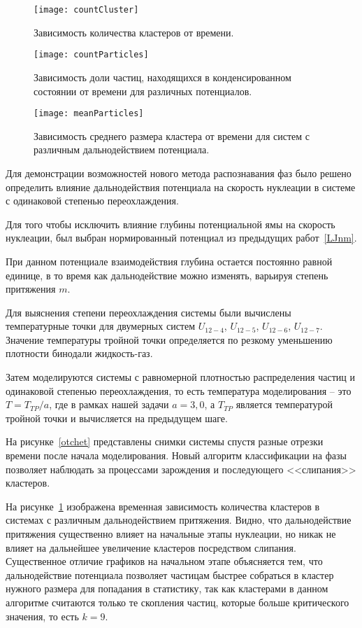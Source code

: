 \begin{figure}[!t]
  \centering
  \texttt{[image: countCluster]}
  \caption{Зависимость количества кластеров от времени.}
  \label{countCluster}
\end{figure}

\begin{figure}[!t]
  \centering
  \texttt{[image: countParticles]}
  \caption{Зависимость доли частиц, находящихся в конденсированном состоянии от времени для различных потенциалов.}
  \label{countParticles}
\end{figure}

\begin{figure}[!t]
  \centering
  \texttt{[image: meanParticles]}
  \caption{Зависимость среднего размера кластера от времени для систем с различным дальнодействием потенциала.}
  \label{meanParticles}
\end{figure}

Для демонстрации возможностей нового метода распознавания фаз было решено определить влияние дальнодействия потенциала на скорость нуклеации в системе с одинаковой степенью переохлаждения.

Для того чтобы исключить влияние глубины потенциальной ямы на скорость нуклеации, был выбран нормированный потенциал из предыдущих работ~\ref{LJnm}.

При данном потенциале взаимодействия глубина остается постоянно равной единице, в то время как дальнодействие можно изменять, варьируя степень притяжения $m$.

Для выяснения степени переохлаждения системы были вычислены температурные точки для двумерных систем $U_{12-4}$, $U_{12-5}$, $U_{12-6}$, $U_{12-7}$.
Значение температуры тройной точки определяется по резкому уменьшению плотности бинодали жидкость-газ.

Затем моделируются системы с равномерной плотностью распределения частиц и одинаковой степенью переохлаждения, то есть температура моделирования -- это $T = T_{TP} / a$, где в рамках нашей задачи $a = 3{,}0$, а $T_{TP}$ является температурой тройной точки и вычисляется на предыдущем шаге.

На рисунке~\ref{otchet} представлены снимки системы спустя разные отрезки времени после начала моделирования.
Новый алгоритм классификации на фазы позволяет наблюдать за процессами зарождения и последующего <<слипания>> кластеров.


На рисунке~\ref{countCluster} изображена временная зависимость количества кластеров в системах с различным дальнодействием притяжения. 
Видно, что дальнодействие притяжения существенно влияет на начальные этапы нуклеации, но никак не влияет на дальнейшее увеличение кластеров посредством слипания.
Существенное отличие графиков на начальном этапе объясняется тем, что дальнодействие потенциала позволяет частицам быстрее собраться в кластер нужного размера для попадания в статистику, так как кластерами в данном алгоритме считаются только те скопления частиц, которые больше критического значения, то есть $k = 9$.


